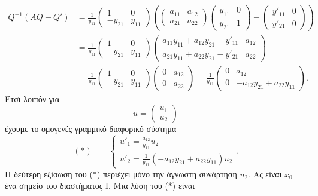 \documentclass[11pt,a4paper,twoside]{book}
\begin{document}
\begin{align*}
Q^{-1}(AQ-Q') &= \frac{1}{y_{11}}
\begin{pmatrix}
1 & 0 \\
-y_{21} & y_{11}
\end{pmatrix}
\left(
\begin{pmatrix}
a_{11} & a_{12} \\
a_{21} & a_{22}
\end{pmatrix}
\begin{pmatrix}
y_{11} & 0 \\
y_{21} & 1
\end{pmatrix}
-
\begin{pmatrix}
y'_{11} & 0 \\
y'_{21} & 0
\end{pmatrix}
\right) \\
&= \frac{1}{y_{11}}
\begin{pmatrix}
1 & 0 \\
-y_{21} & y_{11}
\end{pmatrix}
\begin{pmatrix}
a_{11}y_{11}+a_{12}y_{21}-y'_{11} & a_{12} \\
a_{21}y_{11}+a_{22}y_{21}-y'_{21} & a_{22}
\end{pmatrix} \\
&= \frac{1}{y_{11}}
\begin{pmatrix}
1 & 0 \\
-y_{21} & y_{11}
\end{pmatrix}
\begin{pmatrix}
0 & a_{12} \\
0 & a_{22}
\end{pmatrix}
= \frac{1}{y_{11}}
\begin{pmatrix}
0 & a_{12} \\
0 & -a_{12}y_{21}+a_{22}y_{11}
\end{pmatrix}
.
\end{align*}
Έτσι λοιπόν για
\[
u = 
\begin{pmatrix}
u_1 \\
u_2
\end{pmatrix}
\]
έχουμε το ομογενές γραμμικό διαφορικό σύστημα
\[
(*) \qquad
\begin{cases}
u'_1 = \frac{a_{12}}{y_{11}} u_2 \\
u'_2 = \frac{1}{y_{11}}(-a_{12}y_{21}+a_{22}y_{11})u_2
\end{cases}
.
\]
Η δεύτερη εξίσωση του (*) περιέχει μόνο την άγνωστη συνάρτηση $u_2$. Ας είναι $x_0$ ένα σημείο του διαστήματος Ι. Μια λύση του (*) είναι
\end{document}
